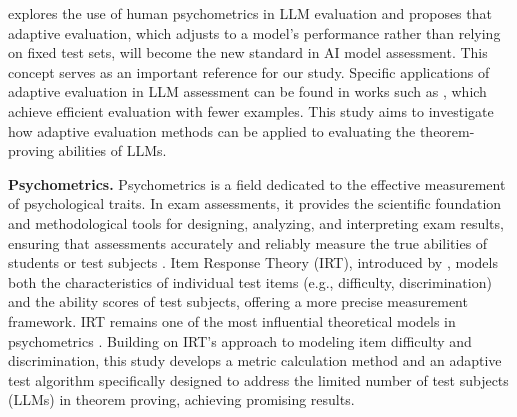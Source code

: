 \cite{zhuang2023efficiently} explores the use of human psychometrics in LLM evaluation and proposes that adaptive evaluation, which adjusts to a model’s performance rather than relying on fixed test sets, will become the new standard in AI model assessment. This concept serves as an important reference for our study. Specific applications of adaptive evaluation in LLM assessment can be found in works such as \cite{polo2024tinybenchmarks, yuan2024s}, which achieve efficient evaluation with fewer examples. This study aims to investigate how adaptive evaluation methods can be applied to evaluating the theorem-proving abilities of LLMs.

\textbf{Psychometrics.} Psychometrics is a field dedicated to the effective measurement of psychological traits. In exam assessments, it provides the scientific foundation and methodological tools for designing, analyzing, and interpreting exam results, ensuring that assessments accurately and reliably measure the true abilities of students or test subjects \cite{furr2021psychometrics, templin2010diagnostic, mislevy2003brief}. Item Response Theory (IRT), introduced by \cite{baker2001basics}, models both the characteristics of individual test items (e.g., difficulty, discrimination) and the ability scores of test subjects, offering a more precise measurement framework. IRT remains one of the most influential theoretical models in psychometrics \cite{fayers2004item}. Building on IRT’s approach to modeling item difficulty and discrimination, this study develops a metric calculation method and an adaptive test algorithm specifically designed to address the limited number of test subjects (LLMs) in theorem proving, achieving promising results.